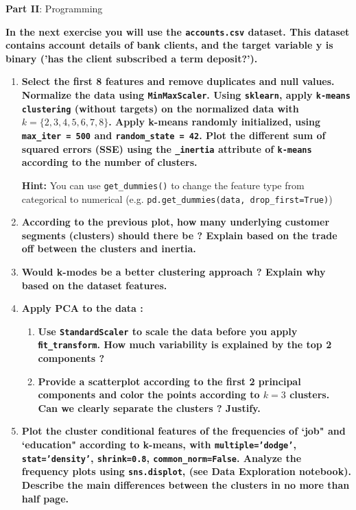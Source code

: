 \documentclass[12pt]{article}
\begin{document}
\vspace{20pt}
\large{\textbf{Part II}: Programming}\normalsize

\vspace{20pt}
\textbf{In the next exercise you will use the \texttt{accounts.csv} dataset. This dataset contains account details
of bank clients, and the target variable y is binary ('has the client subscribed a term deposit?').}

\begin{enumerate}
    \item \textbf{Select the first 8 features and remove duplicates and null values. Normalize the data
    using \texttt{MinMaxScaler}. Using \texttt{sklearn}, apply \texttt{k-means clustering} (without targets) on the
    normalized data with \( k = \{2,3,4,5,6,7,8\} \). Apply k-means randomly initialized, using \texttt{max\_iter = 500}
    and \texttt{random\_state = 42}. Plot the different sum of squared errors (SSE) using the
    \texttt{\_inertia} attribute of \texttt{k-means} according to the number of clusters.}
    
    \textbf{Hint:} You can use \texttt{get\_dummies()} to change the feature type from categorical to numerical
    (e.g. \texttt{pd.get\_dummies(data, drop\_first=True)})

    \item \textbf{According to the previous plot, how many underlying customer segments (clusters)
    should there be ? Explain based on the trade off between the clusters and inertia.}

    \item \textbf{Would k-modes be a better clustering approach ? Explain why based on the dataset
    features.}

    \item \textbf{Apply PCA to the data :}
    
    \begin{enumerate}[label=\alph*)]
        \item \textbf{Use \texttt{StandardScaler} to scale the data before you apply \texttt{ﬁt\_transform}. How much
        variability is explained by the top 2 components ?}
        \item \textbf{Provide a scatterplot according to the ﬁrst 2 principal components and color the
        points according to $k=3$ clusters. Can we clearly separate the clusters ? Justify.}
    \end{enumerate}
    
    \item \textbf{Plot the cluster conditional features of the frequencies of `job" and `education"
    according to k-means, with \texttt{multiple='dodge'}, \texttt{stat='density'}, \texttt{shrink=0.8},
    \texttt{common\_norm=False}. Analyze the frequency plots using \texttt{sns.displot}, (see Data Exploration
    notebook). Describe the main diﬀerences between the clusters in no more than half page.}








\end{enumerate}
\end{document}
